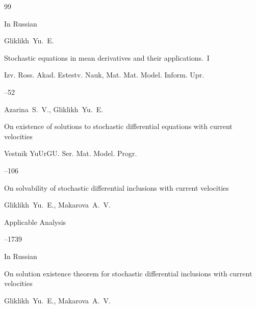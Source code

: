 \begin{thebibliography}{99}




\lang In Russian

\by Gliklikh~Yu.~E.

\paper Stochastic equations in mean derivatives and their applications.~I

\jour Izv. Ross. Akad. Estestv. Nauk, Mat. Mat. Model. Inform. Upr. 




--52





\by Azarina~S.~V., Gliklikh~Yu.~E.

\paper On existence of solutions to stochastic differential equations with current velocities

\jour Vestnik YuUrGU. Ser. Mat. Model. Progr.




--106







\paper On solvability of stochastic differential inclusions with current velocities

\by Gliklikh~Yu.~E., Makarova~A.~V.

\jour Applicable Analysis




--1739





\lang In Russian

\paper On solution existence theorem for stochastic differential inclusions with current velocities 

\by Gliklikh~Yu.~E., Makarova~A.~V.


\end{thebibliography}

